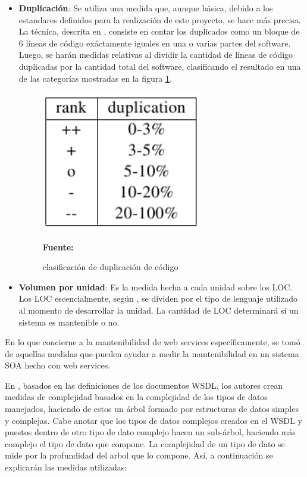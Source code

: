 \begin{itemize}
 \item \textbf{Duplicación}: Se utiliza una medida que, aunque básica, debido a los estandares definidos para la realización de este proyecto, se hace más precisa. La técnica, descrita en \cite{measuring_maintainability}, consiste en contar los duplicados como un bloque de 6 líneas de código exáctamente iguales en una o varias partes del software. Luego, se harán medidas relativas al dividir la cantidad de líneas de código duplicadas por la cantidad total del software, clasificando el resultado en una de las categorías mostradas en la figura \ref{fig:mantainability4}.

\begin{figure}[!htb]
  \begin{center}
    \includegraphics[width=7cm]{./imagenes/mantainability4.png}
    \caption{clasificación de duplicación de código}
    \label{fig:mantainability4}
    \textbf{Fuente:}  \cite{measuring_maintainability}
  \end{center}
\end{figure}

 \item \textbf{Volumen por unidad}: Es la medida hecha a cada unidad sobre los LOC. Los LOC escencialmente, según \cite{measuring_maintainability}, se dividen por el tipo de lenguaje utilizado al momento de desarrollar la unidad. La cantidad de LOC determinará si un sistema es mantenible o no.

\end{itemize}

En lo que concierne a la mantenibilidad de web services específicamente, se tomó de \cite{complexity_mesure} aquellas medidas que pueden ayudar a medir la mantenibilidad en un sistema SOA hecho con web services. 

En \cite{complexity_mesure}, basados en las definiciones de los documentos WSDL, los autores crean medidas de complejidad basados en la complejidad de los tipos de datos manejados, haciendo de estos un árbol formado por estructuras de datos simples y complejas. Cabe anotar que los tipos de datos complejos creados en el WSDL y puestos dentro de otro tipo de dato complejo hacen un sub-árbol, haciendo más complejo el tipo de dato que compone. La complejidad de un tipo de dato se mide por la profundidad del arbol que lo compone. Así, a continuación se explicarán las medidas utilizadas:

